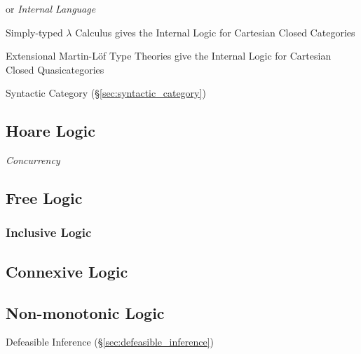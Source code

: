 or \emph{Internal Language}

Simply-typed $\lambda$ Calculus gives the Internal Logic for
Cartesian Closed Categories

Extensional Martin-L\"of Type Theories give the Internal Logic for
Cartesian Closed Quasicategories

Syntactic Category (\S\ref{sec:syntactic_category})



\subsection{Hoare Logic}\label{sec:hoare_logic}

\emph{Concurrency}



\subsection{Free Logic}\label{sec:free_logic}

\subsubsection{Inclusive Logic}\label{sec:inclusive_logic}



\subsection{Connexive Logic}\label{sec:connexive_logic}

\subsection{Non-monotonic Logic}\label{sec:nonmonotonic_logic}

Defeasible Inference (\S\ref{sec:defeasible_inference})



